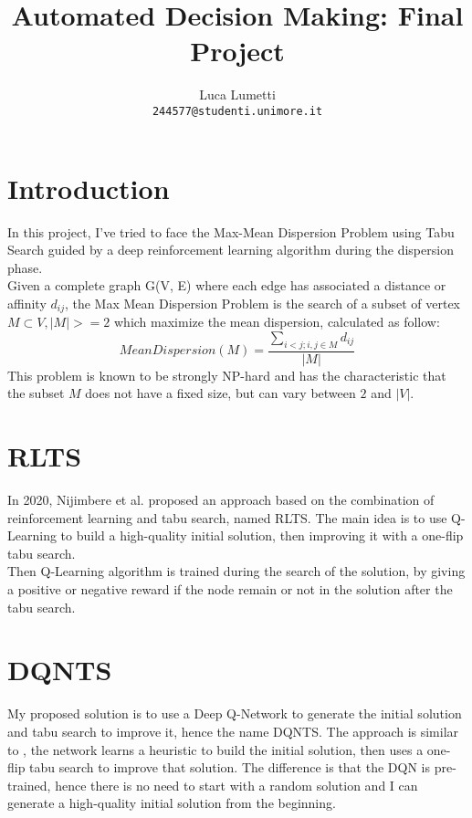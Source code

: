 \documentclass{article}
\title{Automated Decision Making: Final Project}
\author{Luca Lumetti\\ \texttt{244577@studenti.unimore.it}}
\begin{document}
\maketitle

\section{Introduction}
In this project, I've tried to face the Max-Mean Dispersion Problem using Tabu
Search guided by a deep reinforcement learning algorithm during the dispersion phase.\\
Given a complete graph G(V, E) where each edge has associated a distance or
affinity $d_{ij}$, the Max Mean Dispersion Problem is the search of a subset of
vertex $M \subset V, |M| >= 2$ which maximize the mean dispersion, calculated as
follow:
$$
MeanDispersion(M) = \frac{\sum_{i<j; i,j \in M}d_{ij}}{|M|}
$$
This problem is known to be strongly NP-hard \cite{prokopyev2009equitable} and
has the characteristic that the subset $M$ does not have a fixed size, but can
vary between $2$ and $|V|$.
\section{RLTS}
In 2020, Nijimbere et al. proposed an approach based on the
combination of reinforcement learning and tabu search, named RLTS. The main idea is to use
Q-Learning to build a high-quality initial solution, then improving it with a one-flip tabu search.\\
Then Q-Learning algorithm is trained during the search of the solution, by giving
a positive or negative reward if the node remain or not in the solution after
the tabu search.

\section{DQNTS}
My proposed solution is to use a Deep Q-Network to generate the initial solution
and tabu search to improve it, hence the name DQNTS.
The approach is similar to
\cite{nijimbere2020tabu}, the network learns a heuristic to build the initial
solution, then uses a one-flip tabu search to improve that solution.
The difference is that the DQN is pre-trained, hence there is no need to start
with a random solution and I can generate a high-quality initial solution from
the beginning.
\end{document}
